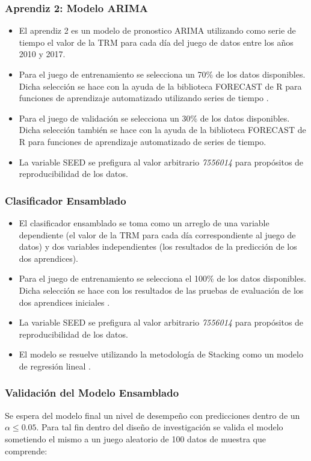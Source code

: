 \subsubsection{Aprendiz 2: Modelo ARIMA}
\begin{itemize}
	\item El aprendiz 2 es un modelo de pronostico ARIMA utilizando como serie de tiempo el valor de la TRM para cada día del juego de datos entre los años 2010 y 2017.
	\item Para el juego de entrenamiento se selecciona un 70\% de los datos disponibles. Dicha selección se hace con la ayuda de la biblioteca FORECAST de R para funciones de aprendizaje automatizado utilizando series de tiempo \cite{hyndman}.
	\item Para el juego de validación se selecciona un 30\% de los datos disponibles. Dicha selección también se hace con la ayuda de la biblioteca FORECAST de R para funciones de aprendizaje automatizado de series de tiempo.
	\item La variable SEED se prefigura al valor arbitrario \emph{7556014} para propósitos de reproducibilidad de los datos.
\end{itemize}

\subsubsection{Clasificador Ensamblado}
\begin{itemize}
	\item El clasificador ensamblado se toma como un arreglo de una variable dependiente (el valor de la TRM para cada día correspondiente al juego de datos) y dos variables independientes (los resultados de la predicción de los dos aprendices).
	\item Para el juego de entrenamiento se selecciona el 100\% de los datos disponibles. Dicha selección se hace con los resultados de las pruebas de evaluación de los dos aprendices iniciales \cite{popularEnsemble}.
	\item La variable SEED se prefigura al valor arbitrario \emph{7556014} para propósitos de reproducibilidad de los datos.
	\item El modelo se resuelve utilizando la metodología de Stacking como un modelo de regresión lineal \cite{smolyakov}.
\end{itemize}

\subsubsection{Validación del Modelo Ensamblado}
Se espera del modelo final un nivel de desempeño con predicciones dentro de un \(\alpha \leq 0.05\). Para tal fin dentro del diseño de investigación se valida el modelo sometiendo el mismo a un juego aleatorio de 100 datos de muestra que comprende:

